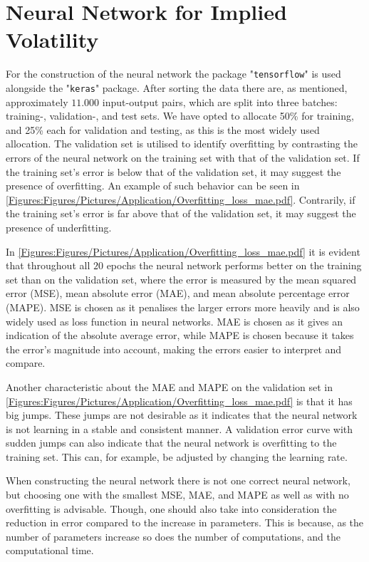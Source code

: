 \section{Neural Network for Implied Volatility}\label{Sec.App:NN}
For the construction of the neural network the package "\lstinline{tensorflow}" is used alongside the "\lstinline{keras}" package. After sorting the data there are, as mentioned, approximately $11.000$ input-output pairs, which are split into three batches: training-, validation-, and test sets. We have opted to allocate 50\% for training, and 25\% each for validation and testing, as this is the most widely used allocation. The validation set is utilised to identify overfitting by contrasting the errors of the neural network on the training set with that of the validation set. If the training set's error is below that of the validation set, it may suggest the presence of overfitting. An example of such behavior can be seen in \autoref{Figures:Figures/Pictures/Application/Overfitting_loss_mae.pdf}. Contrarily, if the training set's error is far above that of the validation set, it may suggest the presence of underfitting.


In \autoref{Figures:Figures/Pictures/Application/Overfitting_loss_mae.pdf} it is evident that throughout all $20$ epochs the neural network performs better on the training set than on the validation set, where the error is measured by the mean squared error (MSE), mean absolute error (MAE), and mean absolute percentage error (MAPE). MSE is chosen as it penalises the larger errors more heavily and is also widely used as loss function in neural networks. MAE is chosen as it gives an indication of the absolute average error, while MAPE is chosen because it takes the error's magnitude into account, making the errors easier to interpret and compare.

Another characteristic about the MAE and MAPE on the validation set in \autoref{Figures:Figures/Pictures/Application/Overfitting_loss_mae.pdf} is that it has big jumps. These jumps are not desirable as it indicates that the neural network is not learning in a stable and consistent manner. A validation error curve with sudden jumps can also indicate that the neural network is overfitting to the training set. This can, for example, be adjusted by changing the learning rate.

When constructing the neural network there is not one correct neural network, but choosing one with the smallest MSE, MAE, and MAPE as well as with no overfitting is advisable. Though, one should also take into consideration the reduction in error compared to the increase in parameters. This is because, as the number of parameters increase so does the number of computations, and the computational time.

